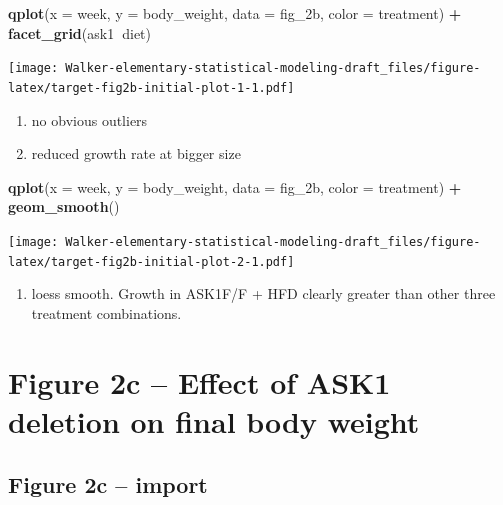 \documentclass[]{book}
\newenvironment{Shaded}{\begin{snugshade}}{\end{snugshade}}
\newcommand{\DataTypeTok}[1]{\textcolor[rgb]{0.13,0.29,0.53}{#1}}
\newcommand{\KeywordTok}[1]{\textcolor[rgb]{0.13,0.29,0.53}{\textbf{#1}}}
\newcommand{\NormalTok}[1]{#1}
\newcommand{\OperatorTok}[1]{\textcolor[rgb]{0.81,0.36,0.00}{\textbf{#1}}}
\newcommand{\StringTok}[1]{\textcolor[rgb]{0.31,0.60,0.02}{#1}}
\providecommand{\tightlist}{%
  \setlength{\itemsep}{0pt}\setlength{\parskip}{0pt}}
\begin{document}
\begin{Shaded}
\begin{Highlighting}[]
\KeywordTok{qplot}\NormalTok{(}\DataTypeTok{x =}\NormalTok{ week,}
      \DataTypeTok{y =}\NormalTok{ body_weight,}
      \DataTypeTok{data =}\NormalTok{ fig_2b,}
      \DataTypeTok{color =}\NormalTok{ treatment) }\OperatorTok{+}
\StringTok{  }\KeywordTok{facet_grid}\NormalTok{(ask1}\OperatorTok{~}\NormalTok{diet)}
\end{Highlighting}
\end{Shaded}

\texttt{[image: Walker-elementary-statistical-modeling-draft\_files/figure-latex/target-fig2b-initial-plot-1-1.pdf]}

\begin{enumerate}
\def\labelenumi{\arabic{enumi}.}
\tightlist
\item
  no obvious outliers
\item
  reduced growth rate at bigger size
\end{enumerate}

\begin{Shaded}
\begin{Highlighting}[]
\KeywordTok{qplot}\NormalTok{(}\DataTypeTok{x =}\NormalTok{ week,}
      \DataTypeTok{y =}\NormalTok{ body_weight,}
      \DataTypeTok{data =}\NormalTok{ fig_2b,}
      \DataTypeTok{color =}\NormalTok{ treatment) }\OperatorTok{+}
\StringTok{  }\KeywordTok{geom_smooth}\NormalTok{()}
\end{Highlighting}
\end{Shaded}

\texttt{[image: Walker-elementary-statistical-modeling-draft\_files/figure-latex/target-fig2b-initial-plot-2-1.pdf]}

\begin{enumerate}
\def\labelenumi{\arabic{enumi}.}
\tightlist
\item
  loess smooth. Growth in ASK1F/F + HFD clearly greater than other three treatment combinations.
\end{enumerate}

\hypertarget{figure-2c-effect-of-ask1-deletion-on-final-body-weight}{%
\section{Figure 2c -- Effect of ASK1 deletion on final body weight}\label{figure-2c-effect-of-ask1-deletion-on-final-body-weight}}

\hypertarget{figure-2c-import}{%
\subsection{Figure 2c -- import}\label{figure-2c-import}}
\end{document}
